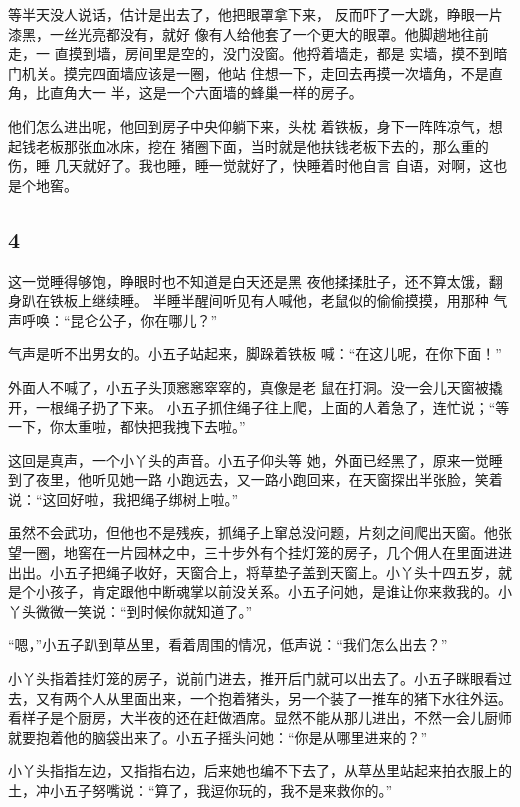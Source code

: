 等半天没人说话，估计是出去了，他把眼罩拿下来， 反而吓了一大跳，睁眼一片漆黑，一丝光亮都没有，就好 像有人给他套了一个更大的眼罩。他脚趟地往前走，一 直摸到墙，房间里是空的，没门没窗。他捋着墙走，都是 实墙，摸不到暗门机关。摸完四面墙应该是一圈，他站 住想一下，走回去再摸一次墙角，不是直角，比直角大一 半，这是一个六面墙的蜂巢一样的房子。

他们怎么进出呢，他回到房子中央仰躺下来，头枕 着铁板，身下一阵阵凉气，想起钱老板那张血冰床，挖在 猪圈下面，当时就是他扶钱老板下去的，那么重的伤，睡 几天就好了。我也睡，睡一觉就好了，快睡着时他自言 自语，对啊，这也是个地窖。
\newline

{\centering\subsection{4}}

这一觉睡得够饱，睁眼时也不知道是白天还是黑 夜他揉揉肚子，还不算太饿，翻身趴在铁板上继续睡。 半睡半醒间听见有人喊他，老鼠似的偷偷摸摸，用那种 气声呼唤：“昆仑公子，你在哪儿？”

气声是听不出男女的。小五子站起来，脚跺着铁板 喊：“在这儿呢，在你下面！”

外面人不喊了，小五子头顶窸窸窣窣的，真像是老 鼠在打洞。没一会儿天窗被撬开，一根绳子扔了下来。 小五子抓住绳子往上爬，上面的人着急了，连忙说；“等 一下，你太重啦，都快把我拽下去啦。”

这回是真声，一个小丫头的声音。小五子仰头等 她，外面已经黑了，原来一觉睡到了夜里，他听见她一路 小跑远去，又一路小跑回来，在天窗探出半张脸，笑着 说：“这回好啦，我把绳子绑树上啦。”

虽然不会武功，但他也不是残疾，抓绳子上窜总没问题，片刻之间爬出天窗。他张望一圈，地窖在一片园林之中，三十步外有个挂灯笼的房子，几个佣人在里面进进出出。小五子把绳子收好，天窗合上，将草垫子盖到天窗上。小丫头十四五岁，就是个小孩子，肯定跟他中断魂掌以前没关系。小五子问她，是谁让你来救我的。小丫头微微一笑说：“到时候你就知道了。”

“嗯，”小五子趴到草丛里，看着周围的情况，低声说：“我们怎么出去？”

小丫头指着挂灯笼的房子，说前门进去，推开后门就可以出去了。小五子眯眼看过去，又有两个人从里面出来，一个抱着猪头，另一个装了一推车的猪下水往外运。看样子是个厨房，大半夜的还在赶做酒席。显然不能从那儿进出，不然一会儿厨师就要抱着他的脑袋出来了。小五子摇头问她：“你是从哪里进来的？”

小丫头指指左边，又指指右边，后来她也编不下去了，从草丛里站起来拍衣服上的土，冲小五子努嘴说：“算了，我逗你玩的，我不是来救你的。”

